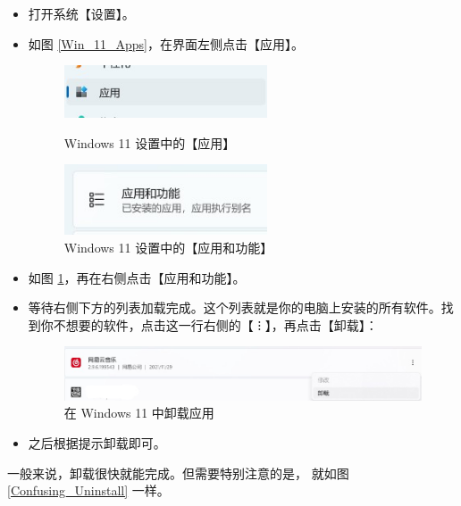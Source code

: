 \begin{itemize}
  \item 打开系统【设置】。
  \item 如图 \ref{Win_11_Apps}，在界面左侧点击【应用】。
    \begin{figure}[htb!]
      \centering
      \begin{minipage}{6.5cm}
        \centering
        \includegraphics[width=6cm]{assets/Win_11_Apps.jpg}
        \caption{Windows 11 设置中的【应用】}
        \label{Win_11_Apps}
      \end{minipage}
      \quad
      \begin{minipage}{7cm}
        \centering
        \includegraphics[width=6cm]{assets/Win_11_Apps_and_Functions.jpg}
        \caption{Windows 11 设置中的【应用和功能】}
        \label{Win_11_Apps_and_Functions}
      \end{minipage}
    \end{figure}
  \item 如图 \ref{Win_11_Apps_and_Functions}，再在右侧点击【应用和功能】。
  \item 等待右侧下方的列表加载完成。这个列表就是你的电脑上安装的所有软件。找到你不想要的软件，点击这一行右侧的【 ⁝ 】，再点击【卸载】：
    \begin{figure}[htb!]
      \centering
      \includegraphics[width=13cm]{assets/Win_11_Unistall.jpg}
      \caption{在 Windows 11 中卸载应用}
      \label{Win_11_Unistall}
    \end{figure}
  \item 之后根据提示卸载即可。
\end{itemize}

一般来说，卸载很快就能完成。但需要特别注意的是，
就如图 \ref{Confusing_Uninstall} 一样。

